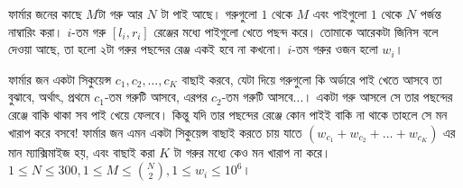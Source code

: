\begin{example}[\href{http://www.usaco.org/index.php?page=viewproblem2&%
  cpid=972}{USACO - Greedy Pie Eaters}]
  ফার্মার জনের কাছে $M$টা গরু আর $N$ টা পাই আছে। গরুগুলো $1$ থেকে $M$ এবং
  পাইগুলো $1$ থেকে $N$ পর্জন্ত নাম্বারিং করা। $i$-তম গরু $[l_i, r_i]$ রেঞ্জের
  মধ্যে পাইগুলো খেতে পছন্দ করে। তোমাকে আরেকটা জিনিস বলে দেওয়া আছে, তা হলো ২টা
  গরুর পছন্দের রেঞ্জ একই হবে না কখনো। $i$-তম গরুর ওজন হলো $w_i$।

  ফার্মার জন একটা সিকুয়েন্স $c_1, c_2, \ldots, c_K$ বাছাই করবে, যেটা দিয়ে
  গরুগুলো কি অর্ডারে পাই খেতে আসবে তা বুঝাবে, অর্থাৎ, প্রথমে $c_1$-তম গরুটি
  আসবে, এরপর $c_2$-তম গরুটি আসবে...। একটা গরু আসলে সে তার পছন্দের রেঞ্জে
  বাকি থাকা সব পাই খেয়ে ফেলবে। কিন্তু যদি তার পছন্দের রেঞ্জে কোন পাইই বাকি না
  থাকে তাহলে সে মন খারাপ করে বসবে! ফার্মার জন এমন একটা সিকুয়েন্স বাছাই করতে
  চায় যাতে $(w_{c_1} + w_{c_2} + \ldots + w_{c_K})$ এর মান ম্যাক্সিমাইজ হয়,
  এবং বাছাই করা $K$ টা গরুর মধ্যে কেও মন খারাপ না করে। $1 \le N \le 300, 1
  \le M \le \binom{N}{2}, 1 \le w_i \le 10^6$।
\end{example}